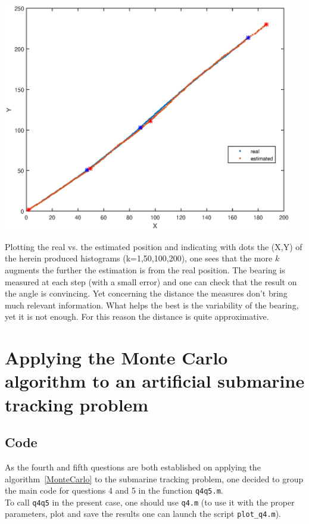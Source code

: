 \documentclass[english,DIV=13]{scrreprt}
\begin{document}
\begin{center}
	\begin{minipage}{.6\textwidth}
		\includegraphics[width=0.95\textwidth]{img/q3_path.eps}
	\end{minipage}%
	\begin{minipage}{.4\textwidth}
		Plotting the real vs. the estimated position and indicating with dots the (X,Y) of the 
		herein produced histograms (k=1,50,100,200), one sees that the more $k$ augments
		the further the estimation is from the real position. The bearing is measured at each step (with a small error) and
		one can check that the result on the angle is convincing. Yet concerning the distance the measures don't bring
		much relevant information. What helps the best is the variability of the bearing, yet it is not enough. For this
		reason the distance is quite approximative.
	\end{minipage}
\end{center}

\chapter{Applying the Monte Carlo algorithm to an artificial submarine 
tracking problem}
\section*{Code}

As the fourth and fifth questions are both established on applying the algorithm~\ref{MonteCarlo}
to the submarine tracking problem, one decided to group the main code for questions 4 and 5
in the function \texttt{q4q5.m}.\\

To call \texttt{q4q5} in the present case, one should use \texttt{q4.m} (to use it with the proper parameters,
plot and save the results one can launch the script \texttt{plot\_q4.m}).\\

\end{document}
